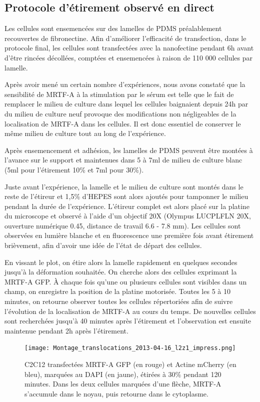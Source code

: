 	\subsection{Protocole d'étirement observé en direct}
	Les cellules sont ensemencées sur des lamelles de PDMS préalablement recouvertes de fibronectine. Afin d'améliorer l'efficacité de transfection, dans le protocole final, les cellules sont transfectées avec la nanofectine pendant 6h avant d'être rincées décollées, comptées et ensemencées à raison de 110 000 cellules par lamelle. 
	
	Après avoir mené un certain nombre d'expériences, nous avons constaté que la sensibilité de MRTF-A à la stimulation par le sérum est telle que le fait de remplacer le milieu de culture dans lequel les cellules baignaient depuis 24h par du milieu de culture neuf provoque des modifications non négligeables de la localisation de MRTF-A dans les cellules. Il est donc essentiel de conserver le même milieu de culture tout au long de l'expérience. 
	
	Après ensemencement et adhésion, les lamelles de PDMS peuvent être montées à l'avance sur le support et maintenues dans 5 à 7ml de milieu de culture blanc (5ml pour l'étirement 10\% et 7ml pour 30\%). 
	
	Juste avant l'expérience, la lamelle et le milieu de culture sont montés dans le reste de l'étireur et 1,5\% d'HEPES sont alors ajoutés pour tamponner le milieu pendant la durée de l'expérience. L'étireur complet est alors placé sur la platine du microscope et observé à l'aide d'un objectif 20X (Olympus LUCPLFLN 20X, ouverture numérique 0.45, distance de travail 6.6 - 7.8 mm). Les cellules sont observées en lumière blanche et en fluorescence une première fois avant étirement brièvement, afin d'avoir une idée de l'état de départ des cellules. 
	
	En vissant le plot, on étire alors la lamelle rapidement en quelques secondes jusqu'à la déformation souhaitée. On cherche alors des cellules exprimant la MRTF-A GFP. À chaque fois qu'une ou plusieurs cellules sont visibles dans un champ, on enregistre la position de la platine motorisée. Toutes les 5 à 10 minutes, on retourne observer toutes les cellules répertoriées afin de suivre l'évolution de la localisation de MRTF-A au cours du temps. De nouvelles cellules sont recherchées jusqu'à 40 minutes après l'étirement et l'observation est ensuite maintenue pendant 2h après l'étirement. 
	\begin{figure}
	\texttt{[image: Montage\_translocations\_2013-04-16\_l2z1\_impress.png]}
	\caption{C2C12 transfectées MRTF-A GFP (en rouge) et Actine mCherry (en bleu), marquées au DAPI (en jaune), étirées à 30\% pendant 120 minutes. Dans les deux cellules marquées d'une flèche, MRTF-A s'accumule dans le noyau, puis retourne dans le cytoplasme.}
	\label{Etirement_live}
	\end{figure}
	
